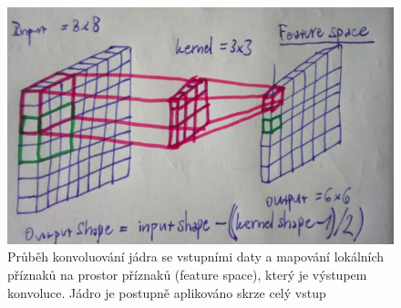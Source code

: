 
\begin{figure}[H]
    \centering
    \includegraphics[scale=0.35]{obrazky-figures/convmapping.png}
    \caption{\label{fig:convmapping}Průběh konvoluování jádra se vstupními daty a mapování lokálních příznaků na prostor příznaků (feature space), který je výstupem konvoluce. Jádro je postupně aplikováno skrze celý vstup}
\end{figure}

